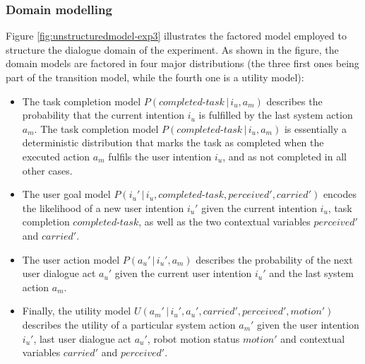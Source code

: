 \subsubsection*{Domain modelling}

Figure \ref{fig:unstructuredmodel-exp3} illustrates the factored model employed to structure the dialogue domain of the experiment.  As shown in the figure, the domain models are factored in four major distributions (the three first ones being part of the transition model, while the fourth one is a utility model): 
\begin{itemize}
\item The task completion model $P(\mathit{completed\mbox{-}task}\, | \, i_u, a_m)$ describes the probability that the current intention $i_u$ is fulfilled by the last system action $a_m$.  The task completion model $P(\mathit{completed\mbox{-}task}\, | \, i_u, a_m)$ is essentially a deterministic distribution that marks the task as completed when the executed action $a_m$ fulfils the user intention $i_u$,  and as not completed in all other cases. %
\item The user goal model $P(i_u' \, | \, i_u, \mathit{completed\mbox{-}task}, \mathit{perceived'}, \mathit{carried'})$ encodes the likelihood of a new user intention $i_u'$ given the current intention $i_u$, task completion $\mathit{completed\mbox{-}task}$, as well as the two contextual variables $\mathit{perceived}'$ and $\mathit{carried}'$. 
\item The user action model $P(a_u'\, | \, i_u', a_m)$ describes the probability of the next user dialogue act $a_u'$ given the current user intention $i_u'$ and the last system action $a_m$.
\item Finally, the utility model $U(a_m' \, | \, i_u', a_u', \mathit{carried'}, \mathit{perceived'}, \mathit{motion'})$ describes the utility of a particular system action $a_m'$ given the user intention $i_u'$, last user dialogue act $a_u'$, robot motion status $\mathit{motion'}$ and contextual variables $\mathit{carried}'$ and $\mathit{perceived}'$. 
\end{itemize}

